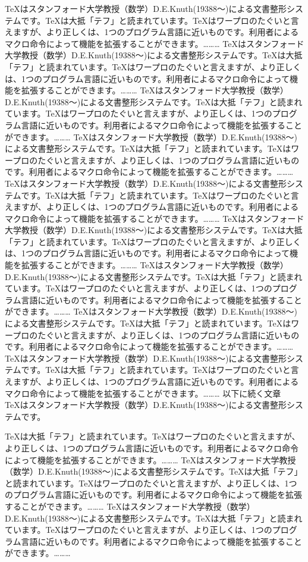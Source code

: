 \documentclass[twocolumn,10pt]{jarticle}
\begin{document}
\twocolumn
TeXはスタンフォード大学教授（数学）D.E.Knuth(19388～)による文書整形システムです。TeXは大抵「テフ」と読まれています。TeXはワープロのたぐいと言えますが、より正しくは、1つのプログラム言語に近いものです。利用者によるマクロ命令によって機能を拡張することができます。………
TeXはスタンフォード大学教授（数学）D.E.Knuth(19388～)による文書整形システムです。TeXは大抵「テフ」と読まれています。TeXはワープロのたぐいと言えますが、より正しくは、1つのプログラム言語に近いものです。利用者によるマクロ命令によって機能を拡張することができます。………
TeXはスタンフォード大学教授（数学）D.E.Knuth(19388～)による文書整形システムです。TeXは大抵「テフ」と読まれています。TeXはワープロのたぐいと言えますが、より正しくは、1つのプログラム言語に近いものです。利用者によるマクロ命令によって機能を拡張することができます。………
TeXはスタンフォード大学教授（数学）D.E.Knuth(19388～)による文書整形システムです。TeXは大抵「テフ」と読まれています。TeXはワープロのたぐいと言えますが、より正しくは、1つのプログラム言語に近いものです。利用者によるマクロ命令によって機能を拡張することができます。………
TeXはスタンフォード大学教授（数学）D.E.Knuth(19388～)による文書整形システムです。TeXは大抵「テフ」と読まれています。TeXはワープロのたぐいと言えますが、より正しくは、1つのプログラム言語に近いものです。利用者によるマクロ命令によって機能を拡張することができます。………
TeXはスタンフォード大学教授（数学）D.E.Knuth(19388～)による文書整形システムです。TeXは大抵「テフ」と読まれています。TeXはワープロのたぐいと言えますが、より正しくは、1つのプログラム言語に近いものです。利用者によるマクロ命令によって機能を拡張することができます。………
TeXはスタンフォード大学教授（数学）D.E.Knuth(19388～)による文書整形システムです。TeXは大抵「テフ」と読まれています。TeXはワープロのたぐいと言えますが、より正しくは、1つのプログラム言語に近いものです。利用者によるマクロ命令によって機能を拡張することができます。………
TeXはスタンフォード大学教授（数学）D.E.Knuth(19388～)による文書整形システムです。TeXは大抵「テフ」と読まれています。TeXはワープロのたぐいと言えますが、より正しくは、1つのプログラム言語に近いものです。利用者によるマクロ命令によって機能を拡張することができます。………
TeXはスタンフォード大学教授（数学）D.E.Knuth(19388～)による文書整形システムです。TeXは大抵「テフ」と読まれています。TeXはワープロのたぐいと言えますが、より正しくは、1つのプログラム言語に近いものです。利用者によるマクロ命令によって機能を拡張することができます。………
\onecolumn
以下に続く文章\\

TeXはスタンフォード大学教授（数学）D.E.Knuth(19388～)による文書整形システムです。\par TeXは大抵「テフ」と読まれています。TeXはワープロのたぐいと言えますが、より正しくは、1つのプログラム言語に近いものです。利用者によるマクロ命令によって機能を拡張することができます。………
TeXはスタンフォード大学教授（数学）D.E.Knuth(19388～)による文書整形システムです。TeXは大抵「テフ」と読まれています。TeXはワープロのたぐいと言えますが、より正しくは、1つのプログラム言語に近いものです。利用者によるマクロ命令によって機能を拡張することができます。………
TeXはスタンフォード大学教授（数学）D.E.Knuth(19388～)による文書整形システムです。TeXは大抵「テフ」と読まれています。TeXはワープロのたぐいと言えますが、より正しくは、1つのプログラム言語に近いものです。利用者によるマクロ命令によって機能を拡張することができます。………
\end{document}
